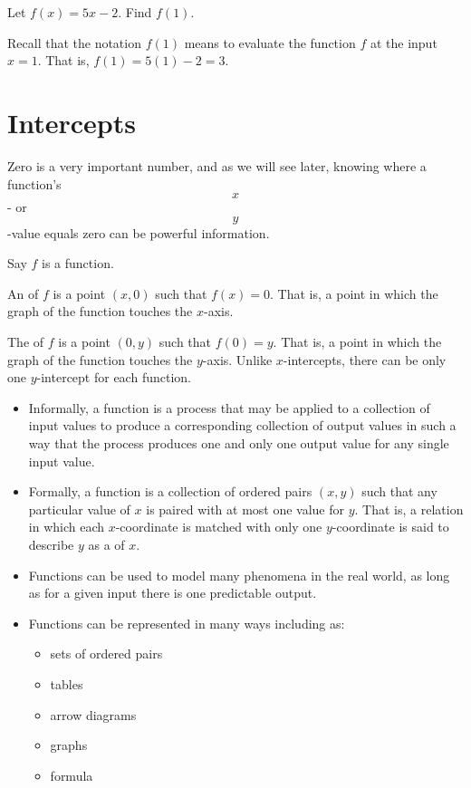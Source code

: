 \documentclass[noauthor, nooutcomes]{ximera}
\begin{document}
\begin{example}
Let $f(x)=5x-2$.  Find $f(1)$.

\begin{explanation}
Recall that the notation $f(1)$ means to evaluate the function $f$ at the input $x=1$.  That is, $f(1)=5(1)-2=3$.
\end{explanation}
\end{example}

\section{Intercepts}
Zero is a very important number, and as we will see later, knowing where a function's $$x$$- or $$y$$-value equals zero can be powerful information. 

\begin{definition}[Intercepts]
Say $f$ is a function. 

An  of $f$ is a point $(x,0)$ such that $f(x) = 0$. That is, a point in which the graph of the function touches the $x$-axis. 

The  of $f$ is a point $(0,y)$ such that $f(0) = y$. That is, a point in which the graph of the function touches the $y$-axis. Unlike $x$-intercepts, there can be only one $y$-intercept for each function.
\end{definition}




\begin{summary}\begin{itemize}
\item Informally, a function is a process that may be applied to a collection of input values to produce a corresponding collection of output values in such a way that the process produces one and only one output value for any single input value.
\item Formally, a function  is a collection of ordered pairs $(x,y)$ such that any particular value of $x$ is paired with at most one value for $y$. That is, a relation in which each $x$-coordinate is matched with only one $y$-coordinate is said to describe $y$ as a  of $x$.
\item Functions can be used to model many phenomena in the real world, as long as for a given input there is one predictable output.
\item Functions can be represented in many ways including as:
\begin{itemize}
\item sets of ordered pairs
\item tables
\item arrow diagrams
\item graphs
\item formula
\end{itemize}
\end{itemize}\end{summary}
\end{document}
